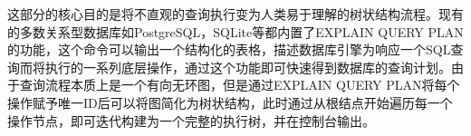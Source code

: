 \begin{CJK*}{UTF8}{song}
这部分的核心目的是将不直观的查询执行变为人类易于理解的树状结构流程。现有的多数关系型数据库如PostgreSQL，SQLite等都内置了EXPLAIN QUERY PLAN的功能，这个命令可以输出一个结构化的表格，描述数据库引擎为响应一个SQL查询而将执行的一系列底层操作，通过这个功能即可快速得到数据库的查询计划。由于查询流程本质上是一个有向无环图，但是通过EXPLAIN QUERY PLAN将每个操作赋予唯一ID后可以将图简化为树状结构，此时通过从根结点开始遍历每一个操作节点，即可迭代构建为一个完整的执行树，并在控制台输出。

\end{CJK*}